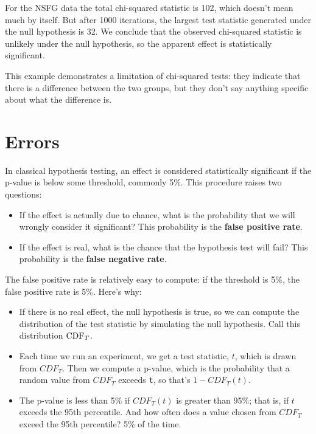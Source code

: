\documentclass[12pt]{book}
\begin{document}
For the NSFG data the total chi-squared statistic is 102, which
doesn't mean much by itself.  But after 1000 iterations, the largest
test statistic generated under the null hypothesis is 32.  We conclude
that the observed chi-squared statistic is unlikely under the null
hypothesis, so the apparent effect is statistically significant.
 

This example demonstrates a limitation of chi-squared tests: they
indicate that there is a difference between the two groups,
but they don't say anything specific about what the difference is.


\section{Errors}

In classical hypothesis testing, an effect is considered statistically
significant if the p-value is below some threshold, commonly 5\%.
This procedure raises two questions:
 

\begin{itemize}

\item If the effect is actually due to chance, what is the probability
that we will wrongly consider it significant?  This
probability is the {\bf false positive rate}.

\item If the effect is real, what is the chance that the hypothesis
test will fail?  This probability is the {\bf false negative rate}.

\end{itemize}

The false positive rate is relatively easy to compute: if the
threshold is 5\%, the false positive rate is 5\%.  Here's why:

\begin{itemize}

\item If there is no real effect, the null hypothesis is true, so we
  can compute the distribution of the test statistic by simulating the
  null hypothesis.  Call this distribution $\mathrm{CDF}_T$.

\item Each time we run an experiment, we get a test statistic, $t$,
  which is drawn from $CDF_T$.  Then we compute a p-value, which is
  the probability that a random value from $CDF_T$ exceeds {\tt t},
  so that's $1 - CDF_T(t)$.

\item The p-value is less than 5\% if $CDF_T(t)$ is greater
  than 95\%; that is, if $t$ exceeds the 95th percentile.
  And how often does a value chosen from $CDF_T$ exceed
  the 95th percentile?  5\% of the time.

\end{itemize}
\end{document}
